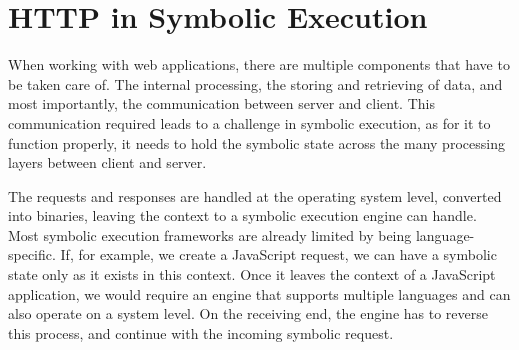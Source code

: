 \section{HTTP in Symbolic Execution}
\label{sec:http}
When working with web applications, there are multiple components that have to be taken care of. The internal processing, the storing and retrieving of data, and most importantly, the communication between server and client.
This communication required leads to a challenge in symbolic execution, as for it to function properly, it needs to hold the symbolic state across the many processing layers between client and server. 

The requests and responses are handled at the operating system level, converted into binaries, leaving the context to a symbolic execution engine can handle. Most symbolic execution frameworks are already limited by being language-specific. If, for example, we create a JavaScript request, we can have a symbolic state only as it exists in this context. Once it leaves the context of a JavaScript application, we would require an engine that supports multiple languages and can also operate on a system level. On the receiving end, the engine has to reverse this process, and continue with the incoming symbolic request.


